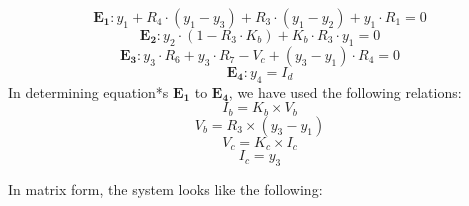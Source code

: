\begin{equation*}
  \mathbf{E_1} : y_1 + R_4\cdot(y_1 - y_3) + R_3 \cdot(y_1 - y_2) + y_1 \cdot R_1 = 0
  \label{eq:kvlA}
\end{equation*}
\begin{equation*}
  \mathbf{E_2} : y_2 \cdot (1-R_3 \cdot K_b) + K_b \cdot R_3 \cdot y_1 = 0
  \label{eq:kvlB}
\end{equation*}
\begin{equation*}
  \mathbf{E_3} : y_3 \cdot R_6 + y_3 \cdot R_7 - V_c + (y_3 - y_1) \cdot R_4 = 0
  \label{eq:kvlC}
\end{equation*}
\begin{equation*}
  \mathbf{E_4} : y_4 = I_d
  \label{eq:kvlD}
\end{equation*}
In determining equation*s $\mathbf{E_1}$ to $\mathbf{E_4}$, we have used the following relations:
\begin{equation*}
  I_b=K_b \times V_b
  \label{eq:extra1}
\end{equation*}
\begin{equation*}
  V_b= R_3 \times (y_3-y_1)
  \label{eq:extra1}
\end{equation*}
\begin{equation*}
  V_c=K_c \times I_c
  \label{eq:extra2}
\end{equation*}
\begin{equation*}
    I_c = y_3
\end{equation*}


In matrix form, the system looks like the following:
\newline
\newline

\newline
\newline
\newline
\newline

